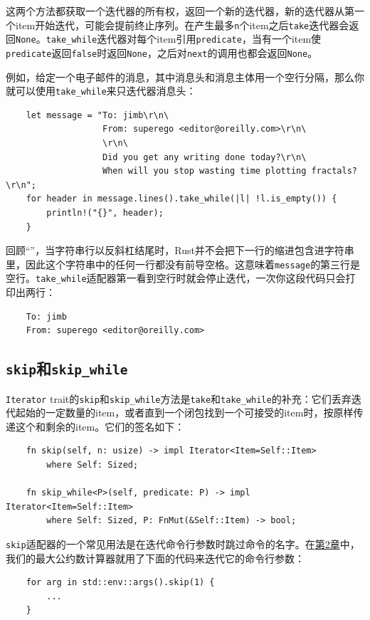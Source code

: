 这两个方法都获取一个迭代器的所有权，返回一个新的迭代器，新的迭代器从第一个item开始迭代，可能会提前终止序列。在产生最多\texttt{n}个item之后\texttt{take}迭代器会返回\texttt{None}。\texttt{take\_while}迭代器对每个item引用\texttt{predicate}，当有一个item使\texttt{predicate}返回\texttt{false}时返回\texttt{None}，之后对\texttt{next}的调用也都会返回\texttt{None}。

例如，给定一个电子邮件的消息，其中消息头和消息主体用一个空行分隔，那么你就可以使用\texttt{take\_while}来只迭代器消息头：
\begin{verbatim}
    let message = "To: jimb\r\n\
                   From: superego <editor@oreilly.com>\r\n\
                   \r\n\
                   Did you get any writing done today?\r\n\
                   When will you stop wasting time plotting fractals?\r\n";
    for header in message.lines().take_while(|l| !l.is_empty()) {
        println!("{}", header);
    }
\end{verbatim}

回顾“”，当字符串行以反斜杠结尾时，Rust并不会把下一行的缩进包含进字符串里，因此这个字符串中的任何一行都没有前导空格。这意味着\texttt{message}的第三行是空行。\texttt{take\_while}适配器第一看到空行时就会停止迭代，一次你这段代码只会打印出两行：
\begin{verbatim}
    To: jimb
    From: superego <editor@oreilly.com>
\end{verbatim}

\subsection{\texttt{skip}和\texttt{skip\_while}}
\texttt{Iterator} trait的\texttt{skip}和\texttt{skip\_while}方法是\texttt{take}和\texttt{take\_while}的补充：它们丢弃迭代起始的一定数量的item，或者直到一个闭包找到一个可接受的item时，按原样传递这个和剩余的item。它们的签名如下：
\begin{verbatim}
    fn skip(self, n: usize) -> impl Iterator<Item=Self::Item>
        where Self: Sized;

    fn skip_while<P>(self, predicate: P) -> impl Iterator<Item=Self::Item>
        where Self: Sized, P: FnMut(&Self::Item) -> bool;
\end{verbatim}

\texttt{skip}适配器的一个常见用法是在迭代命令行参数时跳过命令的名字。在\hyperref[ch02]{第2章}中，我们的最大公约数计算器就用了下面的代码来迭代它的命令行参数：
\begin{verbatim}
    for arg in std::env::args().skip(1) {
        ...
    }
\end{verbatim}

